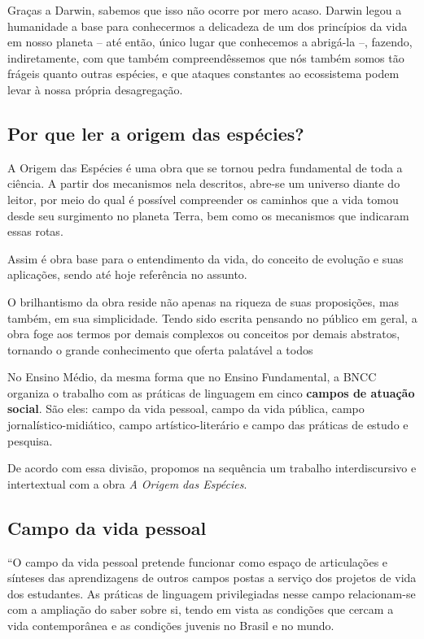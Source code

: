 \documentclass[12pt]{extarticle}
\begin{document}
Graças a Darwin, sabemos que isso não ocorre por mero acaso. Darwin
legou a humanidade a base para conhecermos a delicadeza de um dos
princípios da vida em nosso planeta -- até então, único lugar que
conhecemos a abrigá-la --, fazendo, indiretamente, com que também
compreendêssemos que nós também somos tão frágeis quanto outras
espécies, e que ataques constantes ao ecossistema podem levar à nossa
própria desagregação.

\subsection{Por que ler a origem das espécies?}

A Origem das Espécies é uma obra que se tornou pedra fundamental de toda
a ciência. A partir dos mecanismos nela descritos, abre-se um universo
diante do leitor, por meio do qual é possível compreender os caminhos
que a vida tomou desde seu surgimento no planeta Terra, bem como os
mecanismos que indicaram essas rotas.

Assim é obra base para o entendimento da vida, do conceito de evolução e
suas aplicações, sendo até hoje referência no assunto.

O brilhantismo da obra reside não apenas na riqueza de suas proposições,
mas também, em sua simplicidade. Tendo sido escrita pensando no público
em geral, a obra foge aos termos por demais complexos ou conceitos por
demais abstratos, tornando o grande conhecimento que oferta palatável a
todos


No Ensino Médio, da mesma forma que no Ensino Fundamental, a BNCC
organiza o trabalho com as práticas de linguagem em cinco \textbf{campos
de atuação social}. São eles: campo da vida pessoal, campo da vida
pública, campo jornalístico-midiático, campo artístico-literário e campo
das práticas de estudo e pesquisa.

De acordo com essa divisão, propomos na sequência um trabalho
interdiscursivo e intertextual com a obra \emph{A Origem das Espécies}.

\subsection{Campo da vida pessoal}

``O campo da vida pessoal pretende funcionar como espaço de articulações
e sínteses das aprendizagens de outros campos postas a serviço dos
projetos de vida dos estudantes. As práticas de linguagem privilegiadas
nesse campo relacionam-se com a ampliação do saber sobre si, tendo em
vista as condições que cercam a vida contemporânea e as condições
juvenis no Brasil e no mundo.
\end{document}
